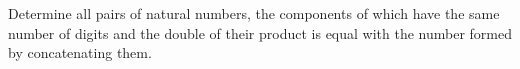 Determine all pairs of natural numbers, the components of which have the same number of digits and the double of their product is equal with the number formed by concatenating them.
